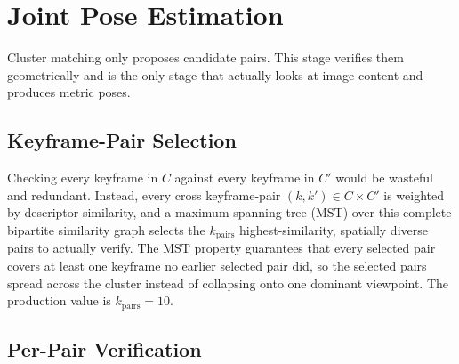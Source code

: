 \section{Joint Pose Estimation}
\label{sec:method-pose-estimation}

Cluster matching only proposes candidate pairs. This stage verifies them geometrically and is
the only stage that actually looks at image content and produces metric poses.

\subsection{Keyframe-Pair Selection}

Checking every keyframe in $C$ against every keyframe in $C'$ would be wasteful and redundant. Instead, every cross keyframe-pair $(k,k') \in C \times C'$ is weighted by descriptor similarity, and a maximum-spanning tree (MST) over this complete bipartite similarity graph selects the $k_{\mathrm{pairs}}$ highest-similarity, spatially diverse pairs to actually verify. The MST property guarantees that every selected pair covers at least one keyframe no earlier selected pair did, so the selected pairs spread across the cluster instead of collapsing onto one dominant viewpoint. The production value is $k_{\mathrm{pairs}} = 10$.

\subsection{Per-Pair Verification}

